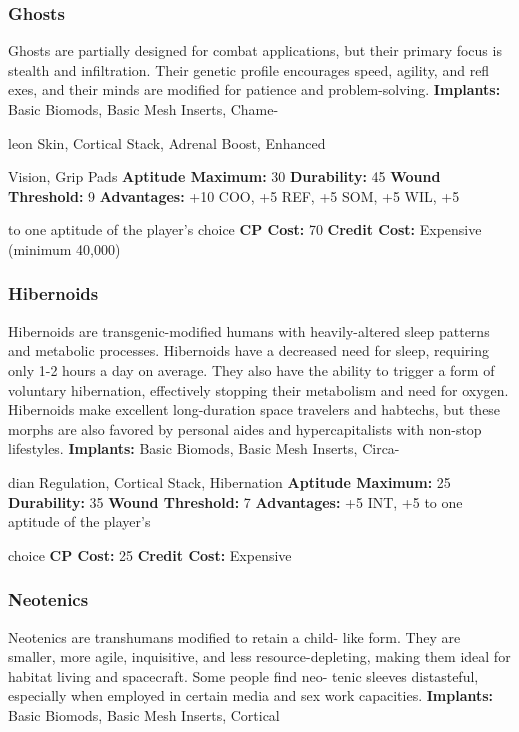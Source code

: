 \subsubsection{Ghosts}

Ghosts are partially designed for combat applications, 
but their primary focus is stealth and infiltration. 
Their genetic profile encourages speed, agility, and 
refl exes, and their minds are modified for patience and 
problem-solving.
\textbf{Implants: }Basic Biomods, Basic Mesh Inserts, Chame-

leon Skin, Cortical Stack, Adrenal Boost, Enhanced 

Vision, Grip Pads
\textbf{Aptitude Maximum: }30
\textbf{Durability:} 45
\textbf{Wound Threshold:} 9
\textbf{Advantages:} +10 COO, +5 REF, +5 SOM, +5 WIL, +5 

to one aptitude of the player's choice
\textbf{CP Cost:} 70
\textbf{Credit Cost: }Expensive (minimum 40,000)

\subsubsection{Hibernoids}

Hibernoids are transgenic-modified humans with 
heavily-altered sleep patterns and metabolic processes. 
Hibernoids have a decreased need for sleep, requiring 
only 1-2 hours a day on average. They also have the 
ability to trigger a form of voluntary hibernation, 
effectively stopping their metabolism and need for 
oxygen. Hibernoids make excellent long-duration 
space travelers and habtechs, but these morphs are 
also favored by personal aides and hypercapitalists 
with non-stop lifestyles.
\textbf{Implants: }Basic Biomods, Basic Mesh Inserts, Circa-

dian Regulation, Cortical Stack, Hibernation
\textbf{Aptitude Maximum: }25
\textbf{Durability: }35
\textbf{Wound Threshold: }7
\textbf{Advantages: }+5 INT, +5 to one aptitude of the player's 

choice
\textbf{CP Cost:} 25
\textbf{Credit Cost: }Expensive

\subsubsection{Neotenics}

Neotenics are transhumans modified to retain a child-
like form. They are smaller, more agile, inquisitive, 
and less resource-depleting, making them ideal for 
habitat living and spacecraft. Some people find neo-
tenic sleeves distasteful, especially when employed in 
certain media and sex work capacities.
\textbf{Implants: }Basic Biomods, Basic Mesh Inserts, Cortical 

